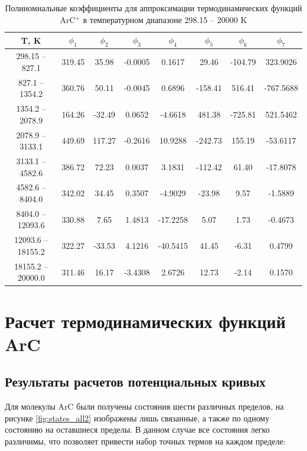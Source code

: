 \documentclass[12pt]{extarticle}
\begin{document}
    \begin{table}[H]
    	\centering
  	    \caption{\label{tab:thermo_polynom} Полиномиальные коэффициенты для аппроксимации термодинамических функций ArC$^{+}$ в температурном диапазоне 298.15 -- 20000 K}
    	\begin{tabular}{|c|c|c|c|c|c|c|c|}
    		\hline
    		T, K               & $\phi_1$ & $\phi_2$ & $\phi_3$ & $\phi_4$ & $\phi_5$ & $\phi_6$ & $\phi_7$  \\ \hline
    		298.15 -- 827.1     & 319.45   & 35.98    & -0.0005  & 0.1617   & 29.46    & -104.79  & 323.9026  \\
    		827.1 -- 1354.2    & 360.76   & 50.11    & -0.0045  & 0.6896   & -158.41  & 516.41   & -767.5688 \\
    		1354.2 -- 2078.9   & 164.26   & -32.49   & 0.0652   & -4.6618  & 481.38   & -725.81  & 521.5462  \\
    		2078.9 -- 3133.1   & 449.69   & 117.27   & -0.2616  & 10.9288  & -242.73  & 155.19   & -53.6117  \\
    		3133.1 -- 4582.6   & 386.72   & 72.23    & 0.0037   & 3.1831   & -112.42  & 61.40    & -17.8078  \\
    		4582.6 -- 8404.0   & 342.02   & 34.45    & 0.3507   & -4.9029  & -23.98   & 9.57     & -1.5889   \\
    		8404.0 -- 12093.6  & 330.88   & 7.65     & 1.4813   & -17.2258 & 5.07     & 1.73     & -0.4673   \\
    		12093.6 -- 18155.2 & 322.27   & -33.53   & 4.1216   & -40.5415 & 41.45    & -6.31    & 0.4799    \\
    		18155.2 -- 20000.0 & 311.46   & 16.17    & -3.4308  & 2.6726   & 12.73    & -2.14    & 0.1570    \\ \hline
    	\end{tabular}
    \end{table}
    
    
    \newpage
    \section{Расчет термодинамических функций ArC}
    
    \subsection{Результаты расчетов потенциальных кривых}
    \label{sec:Chapter4.1}
	
	Для молекулы ArC были получены состояния шести различных пределов, на рисунке \ref{fig:states_all2} изображены лишь связанные, а также по одному состоянию на оставшиеся пределы. В данном случае все состояния легко различимы, что позволяет привести набор точных термов на каждом пределе:
	
\end{document}

